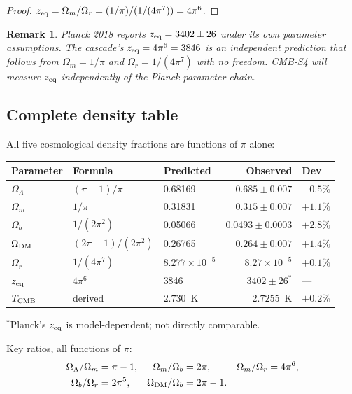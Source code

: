 \documentclass[12pt,a4paper]{article}
\newtheorem*{remark}{Remark}
\begin{document}
\begin{proof}
$z_{\rm eq} = \Omega_m/\Omega_r = (1/\pi)/(1/(4\pi^7)) = 4\pi^6$.
\end{proof}

\begin{remark}
Planck 2018 reports $z_{\rm eq} = 3402 \pm 26$ under its own parameter assumptions. The
cascade's $z_{\rm eq} = 4\pi^6 = 3846$ is an independent prediction that follows from
$\Omega_m = 1/\pi$ and $\Omega_r = 1/(4\pi^7)$ with no freedom. CMB-S4 will measure $z_{\rm eq}$
independently of the Planck parameter chain.
\end{remark}

\subsection{Complete density table}

All five cosmological density fractions are functions of $\pi$ alone:

\begin{center}
\renewcommand{\arraystretch}{1.35}
\begin{tabular}{lllrl}
\toprule
Parameter & Formula & Predicted & Observed & Dev \\
\midrule
$\Omega_\Lambda$ & $(\pi-1)/\pi$ & 0.68169 & $0.685\pm0.007$ & $-0.5\%$ \\
$\Omega_m$ & $1/\pi$ & 0.31831 & $0.315\pm0.007$ & $+1.1\%$ \\
$\Omega_b$ & $1/(2\pi^2)$ & 0.05066 & $0.0493\pm0.0003$ & $+2.8\%$ \\
$\Omega_{\rm DM}$ & $(2\pi-1)/(2\pi^2)$ & 0.26765 & $0.264\pm0.007$ & $+1.4\%$ \\
$\Omega_r$ & $1/(4\pi^7)$ & $8.277\times10^{-5}$ & $8.27\times10^{-5}$ & $+0.1\%$ \\
\midrule
$z_{\rm eq}$ & $4\pi^6$ & 3846 & $3402\pm26^*$ & --- \\
$T_{\rm CMB}$ & derived & $2.730$~K & $2.7255$~K & $+0.2\%$ \\
\bottomrule
\end{tabular}
\end{center}
\noindent$^*$Planck's $z_{\rm eq}$ is model-dependent; not directly comparable.

\medskip\noindent Key ratios, all functions of $\pi$:
\begin{align*}
\Omega_\Lambda/\Omega_m &= \pi-1, &
\Omega_m/\Omega_b &= 2\pi, &
\Omega_m/\Omega_r &= 4\pi^6, \\
\Omega_b/\Omega_r &= 2\pi^5, &
\Omega_{\rm DM}/\Omega_b &= 2\pi-1.
\end{align*}
\end{document}
